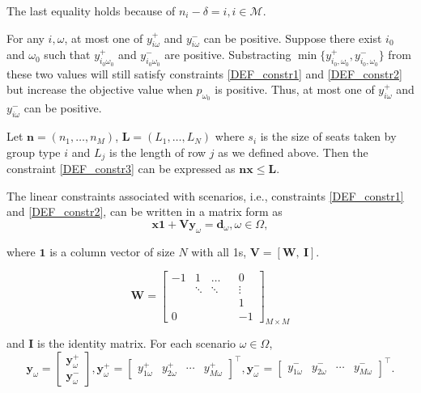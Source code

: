 
The last equality holds because of $n_i- \delta = i, i \in \mathcal{M}$. 

\begin{remark}
For any $i, \omega$, at most one of $y_{i \omega}^{+}$ and $y_{i \omega}^{-}$ can be positive. 
Suppose there exist $i_0$ and $\omega_0$ such that $y_{i_0 \omega_0}^{+}$ and $y_{i_0 \omega_0}^{-}$ are positive. Substracting $\min\{y_{i_0, \omega_0}^{+}, y_{i_0, \omega_0}^{-}\}$ from these two values will still satisfy constraints \eqref{DEF_constr1} and \eqref{DEF_constr2} but increase the objective value when $p_{\omega_0}$ is positive. Thus, at most one of $y_{i \omega}^{+}$ and $y_{i \omega}^{-}$ can be positive. 
\end{remark}


Let $\mathbf{n} = (n_1, \ldots, n_M)$, $\mathbf{L} = (L_1, \ldots, L_N)$ where $s_i$ is the size of seats taken by group type $i$ and $L_j$ is the length of row $j$ as we defined above. Then the constraint \eqref{DEF_constr3} can be expressed as $\mathbf{n} \mathbf{x} \leq \mathbf{L}$.

The linear constraints associated with scenarios, i.e., constraints \eqref{DEF_constr1} and \eqref{DEF_constr2}, can be written in a matrix form as
\[\mathbf{x} \mathbf{1} + \mathbf{V} \mathbf{y}_\omega = \mathbf{d}_\omega, \omega\in \Omega,\]

where $\mathbf{1}$ is a column vector of size $N$ with all 1s, $\mathbf{V} = [\mathbf{W}, ~\mathbf{I}]$.

$$
\mathbf{W}=\left[\begin{array}{ccccc}
-1 & 1 & \ldots & & 0 \\
& \ddots & \ddots & & \vdots \\
& & & & 1 \\
0 & & & & -1
\end{array}\right]_{M \times M}
$$

and $\mathbf{I}$ is the identity matrix. For each scenario $\omega \in \Omega$,
$$
\mathbf{y}_{\omega}=\left[\begin{array}{l}
\mathbf{y}_{\omega}^{+} \\
\mathbf{y}_{\omega}^{-}
\end{array}\right], \mathbf{y}_{\omega}^{+}=\left[\begin{array}{lllll}y_{1 \omega}^{+} & y_{2 \omega}^{+} & \cdots & y_{M \omega}^{+}\end{array}\right]^{\intercal}, \mathbf{y}_{\omega}^{-}=\left[\begin{array}{llll}y_{1 \omega}^{-} & y_{2 \omega}^{-} & \cdots & y_{M \omega}^{-}\end{array}\right]^{\intercal}.
$$

